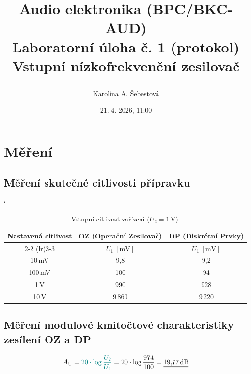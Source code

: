 \documentclass[a4paper, czech]{article}
\title{
    \begin{framed}
        \setstretch{1.5}
        {\large Audio elektronika (BPC/BKC-AUD)}\\
        Laboratorní úloha č. 1 (protokol)\\
        \textbf{Vstupní nízkofrekvenční zesilovač}
    \end{framed}
    }
\author{Karolína A. Šebestová}
\date{21. 4. 2026, 11:00}
\begin{document}
\maketitle

\section{Měření}

\subsection{Měření skutečné citlivosti přípravku}

\begin{table}[H]
    \centering
    \caption{Vstupní citlivost zařízení ($U_2 = 1\,\mathrm{V}$).}
    \catcode`
    \label{tab1}
    \begin{tabular}{ccc}
        \toprule
        \multirow{2}{*}{\setstretch{2}Nastavená citlivost} & OZ (Operační Zesilovač) & DP (Diskrétní Prvky) \\
        \cmidrule(lr){2-2}
        \cmidrule(lr){3-3}
         & $U_1\ [\mathrm{mV}]$ & $U_1\ [\mathrm{mV}]$ \\
        \midrule
        10\,mV  & 9,8         & 9,2         \\
        100\,mV  & 100         & 94          \\
        1\,V & 990         & 928         \\
        10\,V & 9\,860        & 9\,220        \\
        \bottomrule
    \end{tabular}
\end{table}

\subsection{Měření modulové kmitočtové charakteristiky zesílení OZ a DP}

\begin{equation}
    A_\mathrm{U} = \textcolor{teal}{20 \cdot \log \frac{U_2}{U_1}} = 20 \cdot \log \frac{974}{100} = \underline{\underline{19{,}77\,\mathrm{dB}}}
\end{equation}
\end{document}

